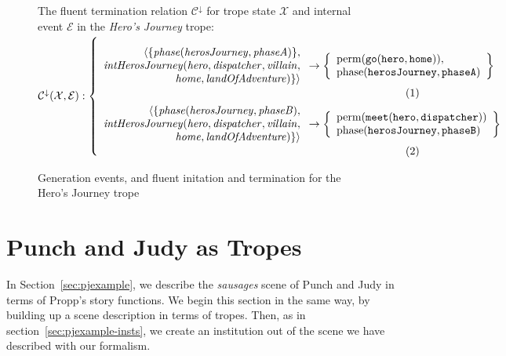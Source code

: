 \documentclass[11pt]{report}
\begin{document}
\begin{figure}[!t]
The fluent termination relation $\mathcal{C^{\downarrow}}$ for trope state $\mathcal{X}$ and internal event $\mathcal{E}$ in the \emph{Hero's Journey} trope:\\
$\mathcal{C^{\downarrow} (X, E)}:\left\{\mbox{%
\begin{minipage}[c]{0.85\textwidth}
\begin{align}
\begin{array}{r}
                                 \langle \{\mathit{phase(herosJourney, phaseA)}\},\\
  \mathit{intHerosJourney(hero, dispatcher, villain},\\ \mathit{home, landOfAdventure)}\} \rangle
  \end{array}
&\rightarrow \left\{
\begin{array}{l}\text{perm}(\mathtt{go(hero, home)}),\\
\text{phase}(\mathtt{herosJourney, phaseA})
\end{array}
\right\}\label{eq:crt}\\
\begin{array}{r}
                                 \langle\{\mathit{phase(herosJourney, phaseB)},\\
  \mathit{intHerosJourney(hero, dispatcher, villain},\\ \mathit{home, landOfAdventure)}\} \rangle
  \end{array}
&\rightarrow \left\{
\begin{array}{l}
\text{perm}(\mathtt{meet(hero, dispatcher)})\\
\text{phase}(\mathtt{herosJourney, phaseB})
\end{array}
\right\}\label{eq:crst}
\end{align}
\end{minipage}
}\right.$
\caption{Generation events, and fluent initation and termination for the Hero's Journey trope}
\label{fig:gen-hero}
\label{fig:init-hero}
\label{fig:term-hero}
\end{figure}

\section{Punch and Judy as Tropes}
\label{sec:punchjudy-tropes}
In Section~\ref{sec:pjexample}, we describe the \emph{sausages} scene of Punch
and Judy in terms of Propp's story functions. We begin this section in the same
way, by building up a scene description in terms of tropes. Then, as in
section~\ref{sec:pjexample-insts}, we create an institution out of the scene we
have described with our formalism. 
\end{document}
